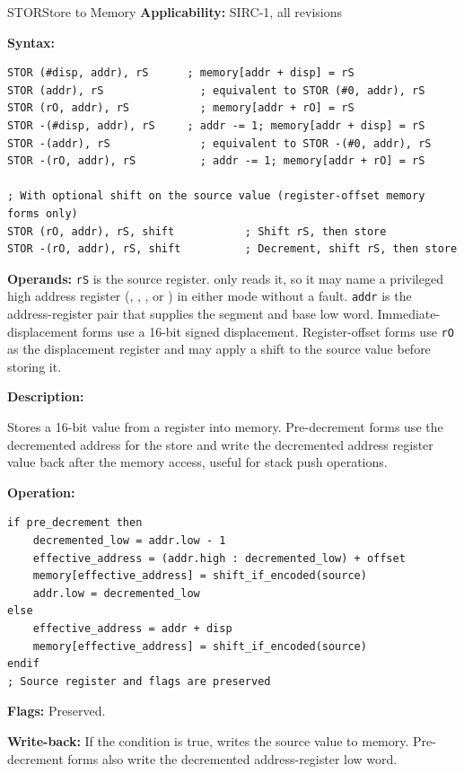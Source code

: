 \begin{instructionbox}{STOR}{Store to Memory}
	\textbf{Applicability:} SIRC-1, all revisions

	\textbf{Syntax:}
	\begin{lstlisting}
STOR (#disp, addr), rS      ; memory[addr + disp] = rS
STOR (addr), rS               ; equivalent to STOR (#0, addr), rS
STOR (rO, addr), rS           ; memory[addr + rO] = rS
STOR -(#disp, addr), rS     ; addr -= 1; memory[addr + disp] = rS
STOR -(addr), rS              ; equivalent to STOR -(#0, addr), rS
STOR -(rO, addr), rS          ; addr -= 1; memory[addr + rO] = rS

; With optional shift on the source value (register-offset memory forms only)
STOR (rO, addr), rS, shift           ; Shift rS, then store
STOR -(rO, addr), rS, shift          ; Decrement, shift rS, then store
\end{lstlisting}

	\textbf{Operands:} \texttt{rS} is the source register.  only reads it, so it may name a privileged high
	address register (, , , or ) in either mode without a fault. \texttt{addr} is the
	address-register pair that supplies the segment and base low word.
	Immediate-displacement forms use a 16-bit signed displacement. Register-offset forms use \texttt{rO} as the displacement
	register and may apply a shift to the source value before storing it.

	\textbf{Description:}

	Stores a 16-bit value from a register into memory. Pre-decrement forms use the decremented address for the store and
	write the decremented address register value back after the memory access, useful for stack push operations.

	\textbf{Operation:}
	\begin{verbatim}
if pre_decrement then
    decremented_low = addr.low - 1
    effective_address = (addr.high : decremented_low) + offset
    memory[effective_address] = shift_if_encoded(source)
    addr.low = decremented_low
else
    effective_address = addr + disp
    memory[effective_address] = shift_if_encoded(source)
endif
; Source register and flags are preserved
\end{verbatim}

	\textbf{Flags:} Preserved.

	\textbf{Write-back:} If the condition is true, writes the source value to memory. Pre-decrement forms also write the
	decremented address-register low word.


\end{instructionbox}
